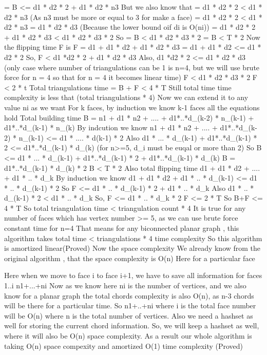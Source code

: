 \documentclass[12pt,a4paper]{article}
\begin{document}
= B <= d1 * d2 * 2 + d1 * d2 * n3
But we also know that 
= d1 * d2 * 2 < d1 * d2 * n3 (As n3 must be more or equal to 3 for make a face)
= d1 * d2 * 2 < d1 * d2 * n3 = d1 * d2 * d3 (Because the lower bound oif di is O(ni))
= d1 * d2 * 2 + d1 * d2 * d3 < d1 * d2 * d3 * 2
So 
= B < d1 * d2 * d3 * 2
= B < T * 2
Now the  flipping time F is 
F = d1 + d1 * d2 + d1 * d2 * d3
= d1 + d1 * d2 <= d1 * d2 * 2
So, F < d1 *d2 * 2 + d1 * d2 * d3
Also, d1 *d2 * 2 <= d1 * d2 * d3 (only case where number of triangulations can be 1 is n=4, but we will use brute force for n = 4 so that for n = 4 it becomes linear time)
F < d1 * d2 * d3 * 2
F < 2 * t
Total triangulations time = B + F < 4  * T
Still total time time complexity is less that (total triangulations * 4)
Now we can extend it to any value ni as we want 
For k faces, by induction we know k-1 faces all the equations hold
Total building time B = n1 + d1 * n2 + .... + d1*..*d_(k-2) * n_(k-1) + d1*..*d_(k-1) * n_(k) 
By indcution we know  n1 + d1 * n2 + .... + d1*..*d_(k-2) * n_(k-1) <= d1 * .... * d(k-1) * 2
Also d1 * ... * d_(k-1) +  d1*..*d_(k-1) * 2  <=  d1*..*d_(k-1) * d_(k) (for n>=5, d_i must be euqal or more than 2)
So B <= d1 * ... * d_(k-1) +  d1*..*d_(k-1) * 2  + d1*..*d_(k-1) * d_(k) 
B = d1*..*d_(k-1) * d_(k) * 2
B < T * 2
Also total flipping time d1 + d1 * d2 + .... + d1 * .. * d_k
By induction we know d1 + d1 * d2 + d1 * .. * d_(k-1) <= d1 * .. * d_(k-1) * 2
So F <= d1 * .. * d_(k-1) * 2 + d1 * .. * d_k
Also d1 * .. * d_(k-1) * 2 < d1 * .. * d_k
So, F <= d1 * .. * d_k * 2
F <= 2 * T
So B+F <= 4 * T
So total triangulation time < triangulation count * 4
It is true for any number of faces which has vertex number >= 5, as we can use brute force constant time for n=4
That means for any biconnected planar graph , 
this algorithm takes total time < triangulations * 4 time complexity
So this algorithm is amortized linear(Proved)
Now the space complexity
We already know from the original algorithm , that the space complexity is O(n)
Here for a particular face

Here when we move to face i to face i+1, we have to save all information for faces 1..i n1+...+ni
Now as we know here ni is the number of vertices, and we also know for a planar graph the total chords complexity is also O(n), as n-3 chords will be there for a particular time. So n1+..+ni where i is the total face number will be O(n) where n is the total number of vertices.
Also we need a hashset as well for storing the current chord information. So, we will keep a hashset as well, where it will also be O(n) space complexity.
As a result our whole algorithm is taking O(n) space compexity and amortized O(1) time complexity (Proved)
\end{document}
